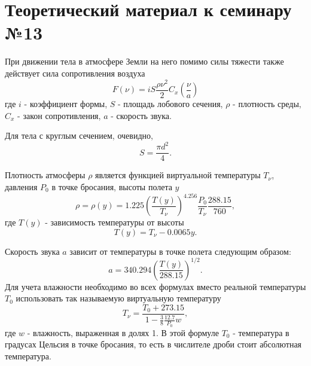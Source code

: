 \section{Теоретический материал к семинару №13}
При движении тела в атмосфере Земли на него помимо силы тяжести также действует сила сопротивления воздуха
\begin{equation} \label{c13eq1}
	F(\nu) = i S \frac{\rho \nu^2}{2} C_x \left( \frac{\nu}{a} \right)
\end{equation}
где $i$ - коэффициент формы, $S$ - площадь лобового сечения, $\rho$ - плотность среды, $C_x$ - закон сопротивления, $a$ - скорость звука.

Для тела с круглым сечением, очевидно, 
\begin{equation} \label{c13eq2}
	S = \frac{\pi d^2}{4}.
\end{equation}

Плотность атмосферы $\rho$ является функцией виртуальной температуры $T_\nu$, давления $P_0$ в точке бросания, высоты полета $y$
\begin{equation} \label{c13eq3}
	\rho = \rho(y) = 1.225 \left( \frac{T(y)}{T_\nu} \right)^{4.256} \frac{P_0}{T_\nu} \frac{288.15}{760},
\end{equation}
где $T(y)$ - зависимость температуры от высоты
\begin{equation} \label{c13eq4}
	T(y) = T_\nu - 0.0065y.
\end{equation}

Скорость звука $a$ зависит от температуры в точке полета следующим образом:
\begin{equation} \label{c13eq5}
	a = 340.294 \left( \frac{T(y)}{288.15} \right)^{1/2}.
\end{equation}
Для учета влажности необходимо во всех формулах вместо реальной температуры $T_0$ использовать так называемую виртуальную температуру
\begin{equation} \label{c13eq6}
	T_\nu = \frac{T_0 + 273.15}{1 - \displaystyle \frac{3}{8} \frac{12.7}{P_0} w},
\end{equation}
где $w$ - влажность, выраженная в долях 1. В этой формуле $T_0$ - температура в градусах Цельсия в точке бросания, то есть в числителе дроби стоит абсолютная температура.

